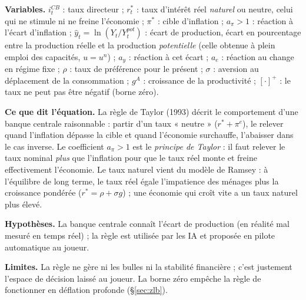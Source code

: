 \documentclass[11pt,a4paper]{article}
\newcommand{\variables}{\par\noindent\textbf{Variables.} }
\newcommand{\sens}{\par\noindent\textbf{Ce que dit l'équation.} }
\newcommand{\hyp}{\par\noindent\textbf{Hypothèses.} }
\newcommand{\limites}{\par\noindent\textbf{Limites.} }
\newcommand{\pos}[1]{{\left[#1\right]^{+}}}
\begin{document}
\begin{lecture}
\variables $i^{CB}_t$ : taux directeur ; $r^\ast_t$ : taux d'intérêt réel \emph{naturel} ou neutre, celui qui ne stimule ni ne freine l'économie ; $\pi^\ast$ : cible d'inflation ; $a_\pi>1$ : réaction à l'écart d'inflation ; $\hat y_t=\ln(Y_t/Y^{pot}_t)$ : écart de production, écart en pourcentage entre la production réelle et la production \emph{potentielle} (celle obtenue à plein emploi des capacités, $u=u^n$) ; $a_y$ : réaction à cet écart ; $a_e$ : réaction au change en régime fixe ; $\rho$ : taux de préférence pour le présent ; $\sigma$ : aversion au déplacement de la consommation ; $g^A$ : croissance de la productivité ; $\pos{\cdot}$ : le taux ne peut pas être négatif (borne zéro).
\sens La règle de Taylor (1993) décrit le comportement d'une banque centrale raisonnable : partir d'un taux « neutre » ($r^\ast+\pi^e$), le relever quand l'inflation dépasse la cible et quand l'économie surchauffe, l'abaisser dans le cas inverse. Le coefficient $a_\pi>1$ est le \emph{principe de Taylor} : il faut relever le taux nominal \emph{plus} que l'inflation pour que le taux réel monte et freine effectivement l'économie. Le taux naturel vient du modèle de Ramsey : à l'équilibre de long terme, le taux réel égale l'impatience des ménages plus la croissance pondérée ($r^\ast=\rho+\sigma g$) ; une économie qui croît vite a un taux naturel plus élevé.
\hyp La banque centrale connaît l'écart de production (en réalité mal mesuré en temps réel) ; la règle est utilisée par les IA et proposée en pilote automatique au joueur.
\limites La règle ne gère ni les bulles ni la stabilité financière ; c'est justement l'espace de décision laissé au joueur. La borne zéro empêche la règle de fonctionner en déflation profonde (\S\ref{sec:zlb}).

\end{lecture}
\end{document}
